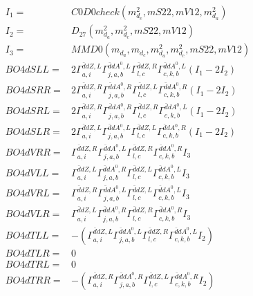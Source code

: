 \documentclass[A4,landscape]{article}
\begin{document}
\begin{align} 
I_1 = & C0D0check(m^2_{d_{{c}}}, mS22, mV12, m^2_{d_{{a}}}) \\ 
I_2 = & D_{27}(m^2_{d_{{a}}}, m^2_{d_{{c}}}, mS22, mV12) \\ 
I_3 = & MMD0(m_{d_{{a}}}, m_{d_{{c}}}, m^2_{d_{{a}}}, m^2_{d_{{c}}}, mS22, mV12) \\ 
  BO4dSLL= & 2  \Gamma^{\bar{d}d Z ,L}_{a, i} \Gamma^{\bar{d}d A^0 ,L}_{j, a, b} \Gamma^{\bar{d}d Z ,R}_{l, c} \Gamma^{\bar{d}d A^0 ,L}_{c, k, b} (I_1 - 2 I_2) \\ 
  BO4dSRR= & 2  \Gamma^{\bar{d}d Z ,R}_{a, i} \Gamma^{\bar{d}d A^0 ,R}_{j, a, b} \Gamma^{\bar{d}d Z ,L}_{l, c} \Gamma^{\bar{d}d A^0 ,R}_{c, k, b} (I_1 - 2 I_2) \\ 
  BO4dSRL= & 2  \Gamma^{\bar{d}d Z ,R}_{a, i} \Gamma^{\bar{d}d A^0 ,R}_{j, a, b} \Gamma^{\bar{d}d Z ,R}_{l, c} \Gamma^{\bar{d}d A^0 ,L}_{c, k, b} (I_1 - 2 I_2) \\ 
  BO4dSLR= & 2  \Gamma^{\bar{d}d Z ,L}_{a, i} \Gamma^{\bar{d}d A^0 ,L}_{j, a, b} \Gamma^{\bar{d}d Z ,L}_{l, c} \Gamma^{\bar{d}d A^0 ,R}_{c, k, b} (I_1 - 2 I_2) \\ 
  BO4dVRR= &  \Gamma^{\bar{d}d Z ,R}_{a, i} \Gamma^{\bar{d}d A^0 ,L}_{j, a, b} \Gamma^{\bar{d}d Z ,R}_{l, c} \Gamma^{\bar{d}d A^0 ,R}_{c, k, b} I_3 \\ 
  BO4dVLL= &  \Gamma^{\bar{d}d Z ,L}_{a, i} \Gamma^{\bar{d}d A^0 ,R}_{j, a, b} \Gamma^{\bar{d}d Z ,L}_{l, c} \Gamma^{\bar{d}d A^0 ,L}_{c, k, b} I_3 \\ 
  BO4dVRL= &  \Gamma^{\bar{d}d Z ,R}_{a, i} \Gamma^{\bar{d}d A^0 ,L}_{j, a, b} \Gamma^{\bar{d}d Z ,L}_{l, c} \Gamma^{\bar{d}d A^0 ,L}_{c, k, b} I_3 \\ 
  BO4dVLR= &  \Gamma^{\bar{d}d Z ,L}_{a, i} \Gamma^{\bar{d}d A^0 ,R}_{j, a, b} \Gamma^{\bar{d}d Z ,R}_{l, c} \Gamma^{\bar{d}d A^0 ,R}_{c, k, b} I_3 \\ 
  BO4dTLL= & -( \Gamma^{\bar{d}d Z ,L}_{a, i} \Gamma^{\bar{d}d A^0 ,L}_{j, a, b} \Gamma^{\bar{d}d Z ,R}_{l, c} \Gamma^{\bar{d}d A^0 ,L}_{c, k, b} I_2) \\ 
  BO4dTLR= & 0 \\ 
  BO4dTRL= & 0 \\ 
  BO4dTRR= & -( \Gamma^{\bar{d}d Z ,R}_{a, i} \Gamma^{\bar{d}d A^0 ,R}_{j, a, b} \Gamma^{\bar{d}d Z ,L}_{l, c} \Gamma^{\bar{d}d A^0 ,R}_{c, k, b} I_2) \\ 
\end{align} 
\end{document}
